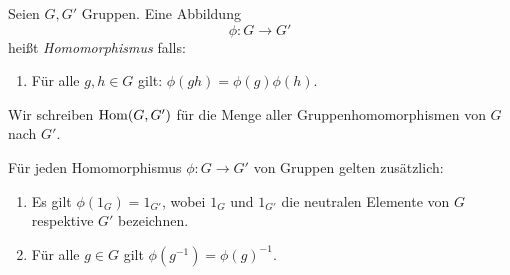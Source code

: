 \documentclass{book}
\begin{document}
\begin{defi}
    \label{defi:ghom}
    Seien $G,G'$ Gruppen. Eine Abbildung  
    \[
        \phi: G \to G'
    \]
    heißt {\em Homomorphismus} falls:
    \begin{enumerate}[leftmargin=1.2cm, label=(H\arabic*), series=hom]
        \item\label{it:H1} Für alle $g,h \in G$ gilt: $\phi(gh) = \phi(g)\phi(h)$.
    \end{enumerate}
    Wir schreiben $\operatorname{Hom}(G,G')$ für die Menge aller Gruppenhomomorphismen von
    $G$ nach $G'$. 
\end{defi}

\begin{prob}
    \label{prob:hom}
    Für jeden Homomorphismus $\phi: G \to G'$ von Gruppen gelten zusätzlich:
    \begin{enumerate}[leftmargin=1.2cm,label=(H\arabic*), resume=hom]
        \item\label{it:H2} Es gilt $\phi(1_G) = 1_{G'}$, wobei $1_G$ und $1_{G'}$ die
            neutralen Elemente von $G$ respektive $G'$ bezeichnen.
        \item\label{it:H3} Für alle $g \in G$ gilt $\phi(g^{-1})= \phi(g)^{-1}$. 
    \end{enumerate}
\end{prob}
\end{document}
